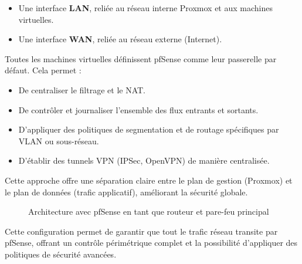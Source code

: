 \begin{itemize}
	\item Une interface \textbf{LAN}, reliée au réseau interne Proxmox et aux machines virtuelles.
	\item Une interface \textbf{WAN}, reliée au réseau externe (Internet).
\end{itemize}

Toutes les machines virtuelles définissent pfSense comme leur passerelle par défaut. Cela permet :

\begin{itemize}
	\item De centraliser le filtrage et le NAT.
	\item De contrôler et journaliser l’ensemble des flux entrants et sortants.
	\item D’appliquer des politiques de segmentation et de routage spécifiques par VLAN ou sous-réseau.
	\item D’établir des tunnels VPN (IPSec, OpenVPN) de manière centralisée.
\end{itemize}

Cette approche offre une séparation claire entre le plan de gestion (Proxmox) et le plan de données (trafic applicatif), améliorant la sécurité globale.

\begin{figure}[H]
	\centering
	\caption{Architecture avec pfSense en tant que routeur et pare-feu principal}
\end{figure}

Cette configuration permet de garantir que tout le trafic réseau transite par pfSense, offrant un contrôle périmétrique complet et la possibilité d’appliquer des politiques de sécurité avancées.

